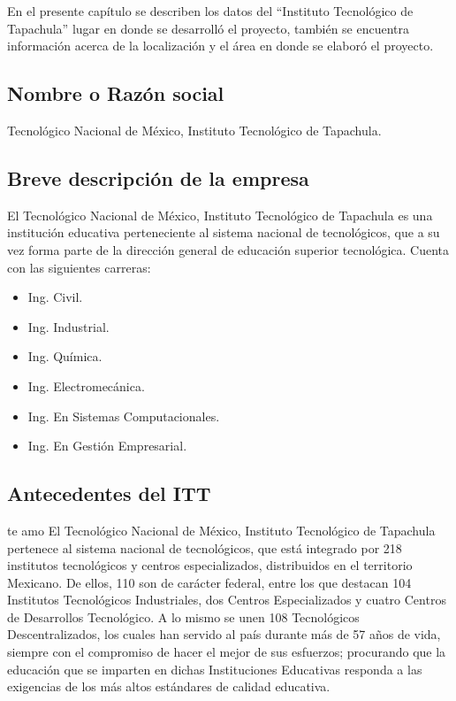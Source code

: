 En el presente capítulo se describen los datos del “Instituto Tecnológico de Tapachula” lugar en donde se desarrolló el proyecto, también se encuentra información acerca de la localización y el área en donde se elaboró el proyecto.

\subsection*{Nombre o Razón social}
Tecnológico Nacional de México, Instituto Tecnológico de Tapachula.

\subsection*{Breve descripción de la empresa}
El Tecnológico Nacional de México, Instituto Tecnológico de Tapachula es una institución educativa perteneciente al sistema nacional de tecnológicos, que a su vez forma parte de la dirección general de educación superior tecnológica. Cuenta con las siguientes carreras: 
\begin{multicols}{2}
{\setlength{\baselineskip}{0.7\baselineskip}\begin{itemize}
	\item Ing. Civil.
	\item Ing. Industrial.
	\item Ing. Química.
	\item Ing. Electromecánica.
	\item Ing. En Sistemas Computacionales.
	\item Ing. En Gestión Empresarial.
\end{itemize}}
\end{multicols}

\subsection*{Antecedentes del ITT}

te amo El Tecnológico Nacional de México, Instituto Tecnológico de Tapachula pertenece al sistema nacional de tecnológicos, que está integrado por 218 institutos tecnológicos y centros especializados, distribuidos en el territorio Mexicano. De ellos, 110 son de carácter federal, entre los que destacan 104 Institutos Tecnológicos Industriales, dos Centros Especializados y cuatro Centros de Desarrollos Tecnológico. A lo mismo se unen 108 Tecnológicos Descentralizados, los cuales han servido al país durante más de 57 años de vida, siempre con el compromiso de hacer el mejor de sus esfuerzos; procurando que la educación que se imparten en dichas Instituciones Educativas responda a las exigencias de los más altos estándares de calidad educativa.

